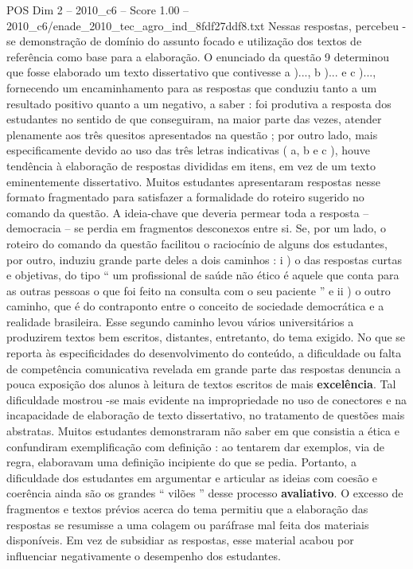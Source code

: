 \begin{textsample}{POS Dim 2 – 2010\_c6 – Score 1.00 – 2010\_c6/enade\_2010\_tec\_agro\_ind\_8fdf27ddf8.txt}
Nessas respostas, percebeu -se demonstração de domínio do assunto focado e utilização dos textos de referência como base para a elaboração.
O enunciado da questão 9 determinou que fosse elaborado um texto dissertativo que contivesse a )..., b )... e c )..., fornecendo um encaminhamento para as respostas que conduziu tanto a um resultado positivo quanto a um negativo, a saber : foi produtiva a resposta dos estudantes no sentido de que conseguiram, na maior parte das vezes, atender plenamente aos três quesitos apresentados na questão ; por outro lado, mais especificamente devido ao uso das três letras indicativas ( a, b e c ), houve tendência à elaboração de respostas divididas em itens, em vez de um texto eminentemente dissertativo.
Muitos estudantes apresentaram respostas nesse formato fragmentado para satisfazer a formalidade do roteiro sugerido no comando da questão.
A ideia-chave que deveria permear toda a resposta – democracia – se perdia em fragmentos desconexos entre si.
Se, por um lado, o roteiro do comando da questão facilitou o raciocínio de alguns dos estudantes, por outro, induziu grande parte deles a dois caminhos : i ) o das respostas curtas e objetivas, do tipo “ um profissional de saúde não ético é aquele que conta para as outras pessoas o que foi feito na consulta com o seu paciente ” e ii ) o outro caminho, que é do contraponto entre o conceito de sociedade democrática e a realidade brasileira.
Esse segundo caminho levou vários universitários a produzirem textos bem escritos, distantes, entretanto, do tema exigido.
No que se reporta às especificidades do desenvolvimento do conteúdo, a dificuldade ou falta de competência comunicativa revelada em grande parte das respostas denuncia a pouca exposição dos alunos à leitura de textos escritos de mais \textbf{excelência}.
Tal dificuldade mostrou -se mais evidente na impropriedade no uso de conectores e na incapacidade de elaboração de texto dissertativo, no tratamento de questões mais abstratas.
Muitos estudantes demonstraram não saber em que consistia a ética e confundiram exemplificação com definição : ao tentarem dar exemplos, via de regra, elaboravam uma definição incipiente do que se pedia.
Portanto, a dificuldade dos estudantes em argumentar e articular as ideias com coesão e coerência ainda são os grandes “ vilões ” desse processo \textbf{avaliativo}.
O excesso de fragmentos e textos prévios acerca do tema permitiu que a elaboração das respostas se resumisse a uma colagem ou paráfrase mal feita dos materiais disponíveis.
Em vez de subsidiar as respostas, esse material acabou por influenciar negativamente o desempenho dos estudantes.

\end{textsample}
